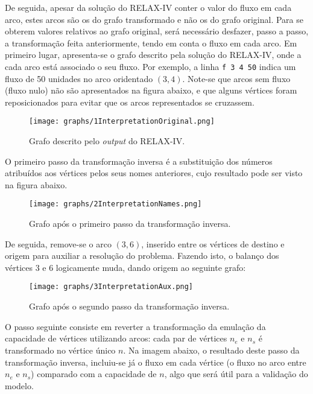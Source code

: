 \documentclass[12pt, a4paper, titlepage]{article}
\begin{document}
De seguida, apesar da solução do RELAX-IV conter o valor do fluxo em cada arco, estes arcos são os
do grafo transformado e não os do grafo original. Para se obterem valores relativos ao grafo
original, será necessário desfazer, passo a passo, a transformação feita anteriormente, tendo em
conta o fluxo em cada arco. Em primeiro lugar, apresenta-se o grafo descrito pela solução do
RELAX-IV, onde a cada arco está associado o seu fluxo. Por exemplo, a linha \texttt{f 3 4 50} indica
um fluxo de 50 unidades no arco oridentado $(3, 4)$. Note-se que arcos sem fluxo (fluxo nulo) não
são apresentados na figura abaixo, e que alguns vértices foram reposicionados para evitar que os
arcos representados se cruzassem.

\begin{figure}[H]
    \centering
    \texttt{[image: graphs/1InterpretationOriginal.png]}
    \caption{Grafo descrito pelo \emph{output} do RELAX-IV.}
    \label{1interpretation-graph}
\end{figure}

O primeiro passo da transformação inversa é a substituição dos números atribuídos aos vértices pelos
seus nomes anteriores, cujo resultado pode ser visto na figura abaixo.

\begin{figure}[H]
    \centering
    \texttt{[image: graphs/2InterpretationNames.png]}
    \caption{Grafo após o primeiro passo da transformação inversa.}
    \label{2interpretation-graph}
\end{figure}

De seguida, remove-se o arco $(3, 6)$, inserido entre os vértices de destino e origem para auxiliar
a resolução do problema. Fazendo isto, o balanço dos vértices 3 e 6 logicamente muda, dando origem
ao seguinte grafo:

\begin{figure}[H]
    \centering
    \texttt{[image: graphs/3InterpretationAux.png]}
    \caption{Grafo após o segundo passo da transformação inversa.}
    \label{3interpretation-graph}
\end{figure}

O passo seguinte consiste em reverter a transformação da emulação da capacidade de vértices
utilizando arcos: cada par de vértices $n_e$ e $n_s$ é transformado no vértice único $n$. Na imagem
abaixo, o resultado deste passo da transformação inversa, incluiu-se já o fluxo em cada vértice (o
fluxo no arco entre $n_e$ e $n_s$) comparado com a capacidade de $n$, algo que será útil para a
validação do modelo.
\end{document}
